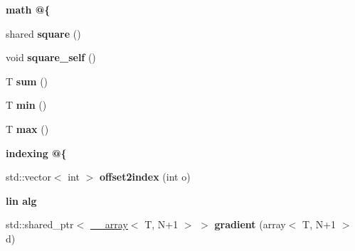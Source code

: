 \begin{Indent}{\bf math @\{}\par
\begin{DoxyCompactItemize}
\item 
\hypertarget{class____array_a566abb01d09bf563edf9f7f761b4317d}{shared {\bfseries square} ()}\label{class____array_a566abb01d09bf563edf9f7f761b4317d}

\item 
\hypertarget{class____array_ad6e7fc66551df684d4337929b8636446}{void {\bfseries square\-\_\-self} ()}\label{class____array_ad6e7fc66551df684d4337929b8636446}

\item 
\hypertarget{class____array_acd4f2a6476211e9d948a0d8ae884a3cc}{T {\bfseries sum} ()}\label{class____array_acd4f2a6476211e9d948a0d8ae884a3cc}

\item 
\hypertarget{class____array_a2edfd07e97b1fdca31ad463f2ef9962f}{T {\bfseries min} ()}\label{class____array_a2edfd07e97b1fdca31ad463f2ef9962f}

\item 
\hypertarget{class____array_a9489124f312f9409853b9bf29b6dd585}{T {\bfseries max} ()}\label{class____array_a9489124f312f9409853b9bf29b6dd585}

\end{DoxyCompactItemize}
\end{Indent}
\begin{Indent}{\bf indexing @\{}\par
\begin{DoxyCompactItemize}
\item 
\hypertarget{class____array_ab5755f3be1a48c4c62a12adc512dac16}{std\-::vector$<$ int $>$ {\bfseries offset2index} (int o)}\label{class____array_ab5755f3be1a48c4c62a12adc512dac16}

\end{DoxyCompactItemize}
\end{Indent}
\begin{Indent}{\bf lin alg}\par
\begin{DoxyCompactItemize}
\item 
\hypertarget{class____array_a0f07f0f2bfe9a0da0aa3744b0d48d390}{std\-::shared\-\_\-ptr$<$ \hyperlink{class____array}{\-\_\-\-\_\-array}$<$ T, N+1 $>$ $>$ {\bfseries gradient} (array$<$ T, N+1 $>$ d)}\label{class____array_a0f07f0f2bfe9a0da0aa3744b0d48d390}

\end{DoxyCompactItemize}
\end{Indent}
